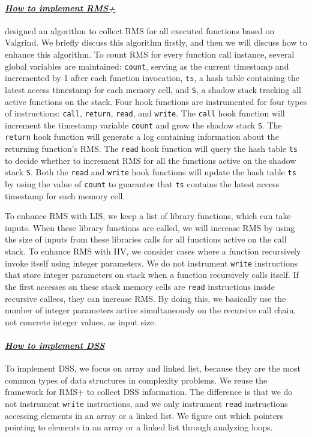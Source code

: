\paragraph{\textit{\underline{How to implement RMS+}}}
\citet{Aprof1,Aprof2} designed an algorithm to collect 
RMS for all executed functions based on 
Valgrind. We briefly discuss this algorithm firstly, 
and then we will discuss how to enhance this algorithm. 
To count RMS for every function call instance, 
several global variables are maintained: 
\texttt{count}, serving as the current timestamp and incremented 
by 1 after each function invocation,  
\texttt{ts}, a hash table containing the latest access timestamp for each memory cell, 
and \texttt{S}, a shadow stack tracking all active functions on the stack. 
Four hook functions are instrumented for four types of instructions:
\texttt{call}, \texttt{return}, \texttt{read}, and \texttt{write}.
The \texttt{call} hook function will increment the timestamp variable \texttt{count} 
and grow the shadow stack \texttt{S}.
The \texttt{return} hook function will generate a 
log containing information about the returning function's RMS.
The \texttt{read} hook function will query the hash table \texttt{ts} to decide whether 
to increment RMS for all the functions active on the shadow stack \texttt{S}.
Both the \texttt{read} and \texttt{write} hook 
functions will update the hash table \texttt{ts}
by using the value of \texttt{count} to guarantee that \texttt{ts} 
contains the latest access timestamp for each memory cell. 

To enhance RMS with LIS, we keep a list of library functions, which can take inputs.
When these library functions are called,
we will increase RMS by using the size of inputs from these libraries calls 
for all functions active on the call stack. 
To enhance RMS with IIV, 
we consider cases where a function recursively invoke itself using integer parameters. 
We do not instrument \texttt{write} instructions that store integer 
parameters on stack when a function recursively calls itself. 
If the first accesses on these stack memory cells are \texttt{read} 
instructions inside recursive callees, 
they can increase RMS. 
By doing this, we basically use the number of integer parameters 
active simultaneously on the recursive call chain, 
not concrete integer values, as input size.

\paragraph{\textit{\underline{How to implement DSS}}}
To implement DSS, we focus on array and linked list, 
because they are the most common types of data structures in complexity problems. 
We reuse the framework for RMS+ to collect DSS information.
The difference is that we do not instrument \texttt{write} instructions,
and we only instrument \texttt{read} instructions accessing elements 
in an array or a linked list.
We figure out which pointers pointing to elements in an array 
or a linked list through analyzing loops.

